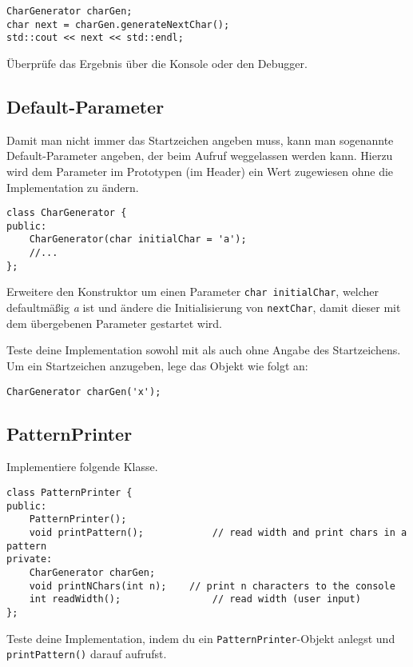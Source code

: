 \begin{lstlisting}
CharGenerator charGen;
char next = charGen.generateNextChar();
std::cout << next << std::endl;
\end{lstlisting}

Überprüfe das Ergebnis über die Konsole oder den Debugger.


\subsection{Default-Parameter}
Damit man nicht immer das Startzeichen angeben muss, kann man sogenannte Default-Parameter angeben, der beim Aufruf weggelassen werden kann.
Hierzu wird dem Parameter im Prototypen (im Header) ein Wert zugewiesen ohne die Implementation zu ändern.

\begin{lstlisting}
class CharGenerator {
public:
	CharGenerator(char initialChar = 'a');
	//...
};
\end{lstlisting}

Erweitere den Konstruktor um einen Parameter \texttt{char initialChar}, welcher defaultmäßig \emph{a} ist und ändere die Initialisierung von \texttt{nextChar}, damit dieser mit dem übergebenen Parameter gestartet wird.

Teste deine Implementation sowohl mit als auch ohne Angabe des Startzeichens.
Um ein Startzeichen anzugeben, lege das Objekt wie folgt an:

\begin{lstlisting}
CharGenerator charGen('x');
\end{lstlisting}


\subsection{PatternPrinter}
Implementiere folgende Klasse.

\begin{lstlisting}
class PatternPrinter {
public:
	PatternPrinter();
	void printPattern();			// read width and print chars in a pattern
private:
	CharGenerator charGen;
	void printNChars(int n);	// print n characters to the console
	int readWidth();				// read width (user input)
};
\end{lstlisting}

Teste deine Implementation, indem du ein \lstinline{PatternPrinter}-Objekt anlegst und \lstinline{printPattern()} darauf aufrufst.

